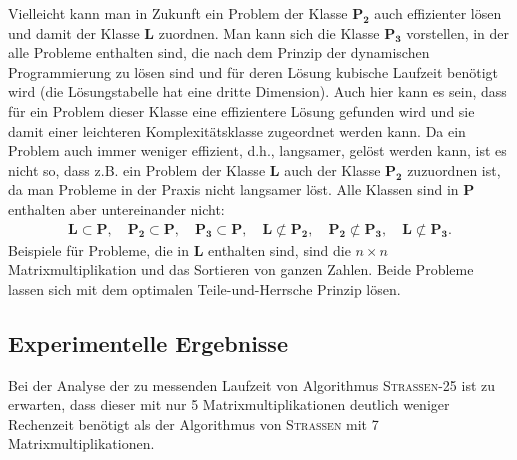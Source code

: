 \documentclass{scrartcl}
\numberwithin{equation}{section}
\begin{document}
Vielleicht kann man in Zukunft ein Problem der Klasse $\mathbf{P_2}$ auch effizienter lösen und damit der Klasse $\mathbf{L}$ zuordnen. Man kann sich die Klasse $\mathbf{P_3}$ vorstellen, in der alle Probleme enthalten sind, die nach dem Prinzip der dynamischen Programmierung zu lösen sind und für deren Lösung kubische Laufzeit benötigt wird (die Lösungstabelle hat eine dritte Dimension). Auch hier kann es sein, dass für ein Problem dieser Klasse eine effizientere Lösung gefunden wird und sie damit einer leichteren Komplexitätsklasse zugeordnet werden kann. Da ein Problem auch immer weniger effizient, d.h., langsamer, gelöst werden kann, ist es nicht so, dass z.B. ein Problem der Klasse $\mathbf{L}$ auch der Klasse $\mathbf{P_2}$ zuzuordnen ist, da man Probleme in der Praxis nicht langsamer löst. Alle Klassen sind in $\mathbf{P}$ enthalten aber untereinander nicht:
\begin{align*}
	\mathbf{L} \subset \mathbf{P}, \quad \mathbf{P_2} \subset \mathbf{P}, \quad \mathbf{P_3} \subset \mathbf{P}, \quad \mathbf{L} \not \subset \mathbf{P_2}, \quad \mathbf{P_2} \not \subset \mathbf{P_3}, \quad \mathbf{L} \not \subset \mathbf{P_3}.
\end{align*}
Beispiele für Probleme, die in $\mathbf{L}$ enthalten sind, sind die $n \times n$ Matrixmultiplikation und das Sortieren von ganzen Zahlen. Beide Probleme lassen sich mit dem optimalen Teile-und-Herrsche Prinzip lösen.

\subsection{Experimentelle Ergebnisse}
Bei der Analyse der zu messenden Laufzeit von Algorithmus \textsc{Strassen-25} ist zu erwarten, dass dieser mit nur 5 Matrixmultiplikationen deutlich weniger Rechenzeit benötigt als der Algorithmus von \textsc{Strassen} mit 7 Matrixmultiplikationen.
\end{document}
